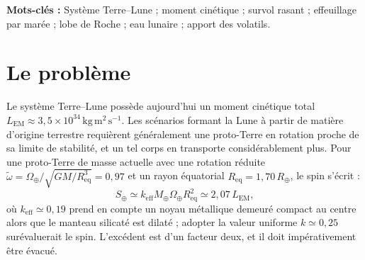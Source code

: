 \documentclass[11pt,a4paper]{article}
\begin{document}
\begin{abstract}
Ce même calcul délimite strictement la portée du mécanisme. Le matériau soulevé n'atteint pas lui-même la limite de Roche dès lors que le passage est incliné des $20$ à $25^\circ$ qu'impose le dégagement du disque ; ce canal évacue donc du moment cinétique sans fournir la masse de la Lune. Le vecteur de moment cinétique emporté fait moins de $2^\circ$ avec l'axe de rotation, de sorte que le passage ne compromet pas l'obliquité observée. Enfin, la géométrie du survol qui optimise cette capture amène simultanément le propre lobe de Roche du perturbateur à portée d'une enveloppe volatile dilatée. Dans la théorie proposée, ce débordement alimenterait une traînée de volatils dont la ré-accrétion différée fournirait principalement l'eau terrestre et, dans une moindre mesure, une contribution au réservoir circumterrestre puis à la Lune.
\end{abstract}

\noindent\textbf{Mots-clés :} Système Terre--Lune ; moment cinétique ; survol rasant ; effeuillage par marée ; lobe de Roche ; eau lunaire ; apport des volatils.

\vspace{1em}
\section{Le problème}

Le système Terre--Lune possède aujourd'hui un moment cinétique total $L_{\mathrm{EM}} \approx 3{,}5 \times 10^{34}\,\mathrm{kg\,m^2\,s^{-1}}$. Les scénarios formant la Lune à partir de matière d'origine terrestre requièrent généralement une proto-Terre en rotation proche de sa limite de stabilité, et un tel corps en transporte considérablement plus. Pour une proto-Terre de masse actuelle avec une rotation réduite $\tilde{\omega} = \Omega_\oplus / \sqrt{GM/R_{\mathrm{eq}}^3} = 0{,}97$ et un rayon équatorial $R_{\mathrm{eq}} = 1{,}70\,R_\oplus$, le spin s'écrit :
\begin{equation}
S_\oplus \simeq k_{\mathrm{eff}} M_\oplus \Omega_\oplus R_{\mathrm{eq}}^2 \simeq 2{,}07\,L_{\mathrm{EM}},
\end{equation}
où $k_{\mathrm{eff}} \simeq 0{,}19$ prend en compte un noyau métallique demeuré compact au centre alors que le manteau silicaté est dilaté ; adopter la valeur uniforme $k \simeq 0{,}25$ surévaluerait le spin. L'excédent est d'un facteur deux, et il doit impérativement être évacué.
\end{document}
